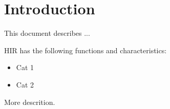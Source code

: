 \section{Introduction}


This document describes ...


HIR has the following functions and characteristics:

\begin{itemize}
\item Cat 1
\item Cat 2
\end{itemize}

More descrition.
